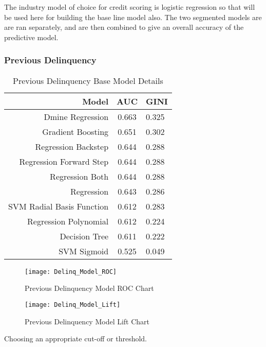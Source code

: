 The industry model of choice for credit scoring is logistic regression so that will be used here for building the base line model also. The two segmented models are are ran separately, and are then combined to give an overall accuracy of the predictive model. 


\subsubsection{Previous Delinquency}

\begin{table}[H]
	\centering
	\begin{tabular}{r | c | l}
		\hline
		\textbf{Model} & \textbf{AUC} & \textbf{GINI} \\
		\hline
		Dmine Regression          & 0.663        & 0.325 \\
		Gradient Boosting          & 0.651        & 0.302 \\
		Regression Backstep          & 0.644        & 0.288 \\
		Regression Forward Step          & 0.644        & 0.288 \\
		Regression Both          & 0.644        & 0.288 \\
		Regression          & 0.643        & 0.286 \\
		SVM Radial Basis Function          & 0.612        & 0.283 \\
		Regression Polynomial          & 0.612        & 0.224 \\
		Decision Tree          & 0.611        & 0.222 \\
		SVM Sigmoid          & 0.525        & 0.049 \\
		\hline
	\end{tabular}
	\caption{Previous Delinquency Base Model Details}
\end{table}


\begin{figure}[H]
	\texttt{[image: Delinq\_Model\_ROC]}
	\caption{Previous Delinquency Model ROC Chart}
	\label{fig:Delinq_Model_ROC}
\end{figure}

\begin{figure}[H]
	\texttt{[image: Delinq\_Model\_Lift]}
	\caption{Previous Delinquency Model Lift Chart}
	\label{fig:Delinq_Model_Lift}
\end{figure}


Choosing an appropriate cut-off or threshold.

